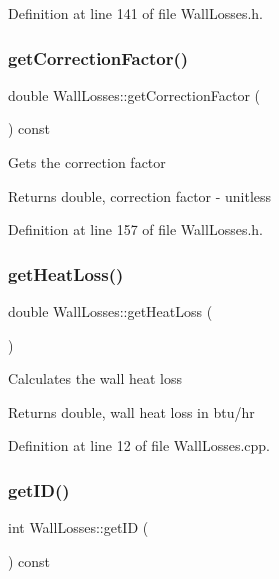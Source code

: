 Definition at line 141 of file Wall\+Losses.\+h.

\mbox{\label{class_wall_losses_a4ce6a0ec36cd868b14b041f18251cb6d}} 
\subsubsection{\texorpdfstring{get\+Correction\+Factor()}{getCorrectionFactor()}}
{\footnotesize\ttfamily double Wall\+Losses\+::get\+Correction\+Factor (\begin{DoxyParamCaption}{ }\end{DoxyParamCaption}) const\hspace{0.3cm}{\ttfamily [inline]}}

Gets the correction factor \begin{DoxyReturn}{Returns}
double, correction factor -\/ unitless 
\end{DoxyReturn}


Definition at line 157 of file Wall\+Losses.\+h.

\mbox{\label{class_wall_losses_a884da3507498878f619cbe5ba340c0ef}} 
\subsubsection{\texorpdfstring{get\+Heat\+Loss()}{getHeatLoss()}}
{\footnotesize\ttfamily double Wall\+Losses\+::get\+Heat\+Loss (\begin{DoxyParamCaption}{ }\end{DoxyParamCaption})}

Calculates the wall heat loss \begin{DoxyReturn}{Returns}
double, wall heat loss in btu/hr 
\end{DoxyReturn}


Definition at line 12 of file Wall\+Losses.\+cpp.

\mbox{\label{class_wall_losses_ae764fa8917879d8c24df7582c159fec6}} 
\subsubsection{\texorpdfstring{get\+I\+D()}{getID()}}
{\footnotesize\ttfamily int Wall\+Losses\+::get\+ID (\begin{DoxyParamCaption}{ }\end{DoxyParamCaption}) const\hspace{0.3cm}{\ttfamily [inline]}}

